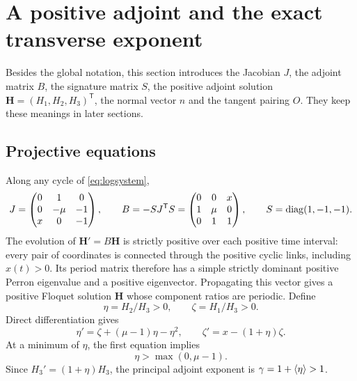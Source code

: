 \section{A positive adjoint and the exact transverse exponent}\label{sec:adjoint}
Besides the global notation, this section introduces the Jacobian $J$, the adjoint matrix $B$, the signature matrix $S$, the positive adjoint solution $\mathbf H=(H_1,H_2,H_3)^{\mathsf T}$, the normal vector $n$ and the tangent pairing $O$. They keep these meanings in later sections.

\subsection{Projective equations}\label{adj:sec:projective}
Along any cycle of \eqref{eq:logsystem},
\begin{equation}\label{eq:adjointmatrices}
J=\begin{pmatrix}0&1&0\\0&-\mu&-1\\x&0&-1\end{pmatrix},\qquad
B=-SJ^{\mathsf T}S=\begin{pmatrix}0&0&x\\1&\mu&0\\0&1&1\end{pmatrix},\qquad
S=\operatorname{diag}(1,-1,-1).
\end{equation}
The evolution of $\mathbf H'=B\mathbf H$ is strictly positive over each positive time interval: every pair of coordinates is connected through the positive cyclic links, including $x(t)>0$. Its period matrix therefore has a simple strictly dominant positive Perron eigenvalue and a positive eigenvector. Propagating this vector gives a positive Floquet solution $\mathbf H$ whose component ratios are periodic. Define
\begin{equation}\label{eq:ratios}
\eta=H_2/H_3>0,\qquad \zeta=H_1/H_3>0.
\end{equation}
Direct differentiation gives
\begin{equation}\label{eq:projective}
\eta'=\zeta+(\mu-1)\eta-\eta^2,\qquad
\zeta'=x-(1+\eta)\zeta.
\end{equation}
At a minimum of $\eta$, the first equation implies
\begin{equation}\label{eq:etaminbasic}
\eta>\max(0,\mu-1).
\end{equation}
Since $H_3'=(1+\eta)H_3$, the principal adjoint exponent is $\gamma=1+\left\langle \eta\right\rangle>1$.


